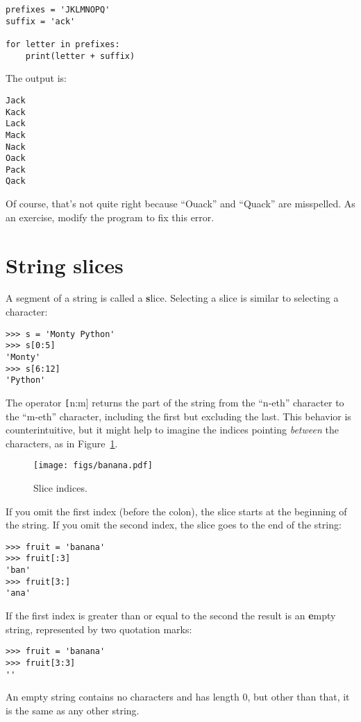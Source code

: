 \documentclass[
DIV=11,
fontsize=13,
twoside,
headinclude=false,
titlepage=firstiscover,
abstract=true,
headsepline=true,
footsepline=true,
chapterprefix=true, %
headings=big,
bibliography=totoc,%
captions=tableheading
]{scrbook}
\theoremstyle{definition}
\begin{document}
\begin{lstlisting}
prefixes = 'JKLMNOPQ'
suffix = 'ack'

for letter in prefixes:
    print(letter + suffix)
\end{lstlisting}
%
The output is:

\begin{lstlisting}
Jack
Kack
Lack
Mack
Nack
Oack
Pack
Qack
\end{lstlisting}
%
Of course, that's not quite right because ``Ouack'' and ``Quack'' are
misspelled.  As an exercise, modify the program to fix this error.



\section{String slices}
\label{slice}
  
 

A segment of a string is called a {\textbf slice}.  Selecting a slice is
similar to selecting a character:

\begin{lstlisting}
>>> s = 'Monty Python'
>>> s[0:5]
'Monty'
>>> s[6:12]
'Python'
\end{lstlisting}
%
The operator {\texttt [n:m]} returns the part of the string from the 
``n-eth'' character to the ``m-eth'' character, including the first but
excluding the last.  This behavior is counterintuitive, but it might
help to imagine the indices pointing {\em between} the
characters, as in Figure~\ref{fig.banana}.

\begin{figure}
\centerline
{\texttt{[image: figs/banana.pdf]}}
\caption{Slice indices.}
\label{fig.banana}
\end{figure}

If you omit the first index (before the colon), the slice starts at
the beginning of the string.  If you omit the second index, the slice
goes to the end of the string:

\begin{lstlisting}
>>> fruit = 'banana'
>>> fruit[:3]
'ban'
>>> fruit[3:]
'ana'
\end{lstlisting}
%
If the first index is greater than or equal to the second the result
is an {\textbf empty string}, represented by two quotation marks:

\begin{lstlisting}
>>> fruit = 'banana'
>>> fruit[3:3]
''
\end{lstlisting}
%
An empty string contains no characters and has length 0, but other
than that, it is the same as any other string.
\end{document}
